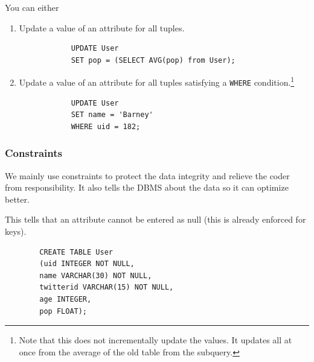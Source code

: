     \begin{definition}
      \label{def:update}
      You can either 
      \begin{enumerate}
        \item Update a value of an attribute for all tuples. 
          \begin{lstlisting}
            UPDATE User 
            SET pop = (SELECT AVG(pop) from User); 
          \end{lstlisting}

        \item Update a value of an attribute for all tuples satisfying a \texttt{WHERE} condition.\footnote{Note that this does not incrementally update the values. It updates all at once from the average of the old table from the subquery.}
          \begin{lstlisting}
            UPDATE User 
            SET name = 'Barney' 
            WHERE uid = 182; 
          \end{lstlisting}
      \end{enumerate}
    \end{definition}

  \subsubsection{Constraints}

    We mainly use constraints to protect the data integrity and relieve the coder from responsibility. It also tells the DBMS about the data so it can optimize better. 

    \begin{definition}
      \label{def:not-null-constraints}
      This tells that an attribute cannot be entered as null (this is already enforced for keys). 
      \begin{lstlisting}
        CREATE TABLE User 
        (uid INTEGER NOT NULL, 
        name VARCHAR(30) NOT NULL, 
        twitterid VARCHAR(15) NOT NULL, 
        age INTEGER, 
        pop FLOAT); 
      \end{lstlisting}
    \end{definition}

